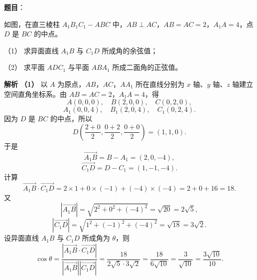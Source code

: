\begin{answer}




\end{answer}
\begin{answer}

\textbf{题目}：

如图，在直三棱柱 $A_1B_1C_1-ABC$ 中，$AB\perp AC$，$AB=AC=2$，$A_1A=4$，点 $D$ 是 $BC$ 的中点。

（1） 求异面直线 $A_1B$ 与 $C_1D$ 所成角的余弦值；

（2） 求平面 $ADC_1$ 与平面 $ABA_1$ 所成二面角的正弦值。
\nopagebreak[4]
\begin{center}\end{center}
\nopagebreak[4]
\textbf{解析}
\textbf{（1）} 以 $A$ 为原点，$AB$，$AC$，$AA_1$ 所在直线分别为 $x$ 轴、$y$ 轴、$z$ 轴建立空间直角坐标系。由 $AB=AC=2$，$A_1A=4$，得
\nopagebreak[4]
\[A(0,0,0),\quad B(2,0,0),\quad C(0,2,0),\]
\nopagebreak[4]
\[A_1(0,0,4),\quad B_1(2,0,4),\quad C_1(0,2,4).\]
因为 $D$ 是 $BC$ 的中点，所以
\nopagebreak[4]
\[D\left(\frac{2+0}{2},\frac{0+2}{2},\frac{0+0}{2}\right)=(1,1,0).\]
于是
\nopagebreak[4]
\[\overrightarrow{A_1B}=B-A_1=(2,0,-4),\]
\nopagebreak[4]
\[\overrightarrow{C_1D}=D-C_1=(1,-1,-4).\]
计算
\nopagebreak[4]
\[\overrightarrow{A_1B}\cdot\overrightarrow{C_1D}
=2\times1+0\times(-1)+(-4)\times(-4)=2+0+16=18.\]
又
\nopagebreak[4]
\[|\overrightarrow{A_1B}|=\sqrt{2^2+0^2+(-4)^2}=\sqrt{20}=2\sqrt5,\]
\nopagebreak[4]
\[|\overrightarrow{C_1D}|=\sqrt{1^2+(-1)^2+(-4)^2}=\sqrt{18}=3\sqrt2.\]
设异面直线 $A_1B$ 与 $C_1D$ 所成角为 $\theta$，则
\nopagebreak[4]
\[\cos\theta
=\frac{|\overrightarrow{A_1B}\cdot\overrightarrow{C_1D}|}
{|\overrightarrow{A_1B}||\overrightarrow{C_1D}|}
=\frac{18}{2\sqrt5\cdot3\sqrt2}
=\frac{18}{6\sqrt{10}}
=\frac{3}{\sqrt{10}}
=\frac{3\sqrt{10}}{10}.\]


\end{answer}
